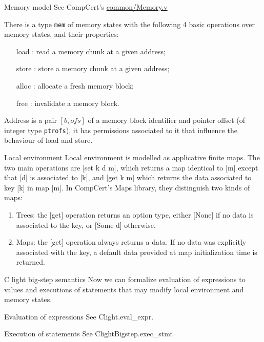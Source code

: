 \documentclass{beamer}
\begin{document}
\begin{frame}{Memory model}
See CompCert's \url{common/Memory.v}



\bigskip
There is a type \texttt{mem} of memory states with  the following 4 basic operations over memory states, and their properties:
\begin{itemize}
\item [load]: read a memory chunk at a given address;
\item [store]: store a memory chunk at a given address;
\item [alloc]: allocate a fresh memory block;
\item [free]: invalidate a memory block.
\end{itemize}

Address is a pair $[b,ofs]$ of a memory block identifier and pointer offset (of integer type \texttt{ptrofs}), it has permissions associated to it that influence the behaviour of load and store.

\end{frame}

\begin{frame}{Local environment}
  Local environment is modelled as applicative finite maps. The two main operations
  are [set k d m], which returns a map identical to [m] except that [d]
  is associated to [k], and [get k m] which returns the data associated
  to key [k] in map [m].  In CompCert's Maps library, they distinguish two kinds of maps:
  \begin{enumerate}
\item Trees: the [get] operation returns an option type, either [None]
  if no data is associated to the key, or [Some d] otherwise.
\item Maps: the [get] operation always returns a data.  If no data was explicitly
  associated with the key, a default data provided at map initialization time
  is returned.
  \end{enumerate}
  \end{frame}

  
  \begin{frame}{C light big-step semantics}
    Now we can formalize evaluation of expressions to values and executions of statements that may modify local environment and memory states. 

  \end{frame}
  \begin{frame}{Evaluation of expressions}
    See  Clight.eval\_expr.
  \end{frame}
  \begin{frame}{Execution of statements}
    See ClightBigstep.exec\_stmt
    \end{frame}
\end{document}
